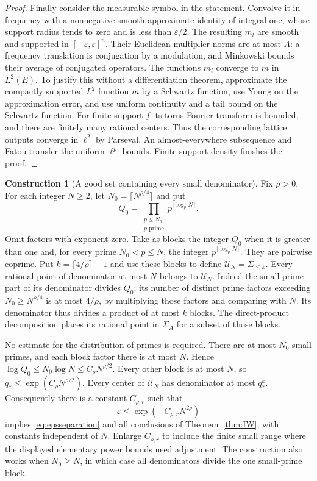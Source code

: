 \documentclass[11pt,oneside]{article}
\theoremstyle{definition}\newtheorem{definition}[theorem]{Definition}
\newtheorem{construction}[theorem]{Construction}
\theoremstyle{remark}\newtheorem{remark}[theorem]{Remark}
\begin{document}
\begin{proof}
Finally consider the measurable symbol in the statement. Convolve it in
frequency with a nonnegative smooth approximate identity of integral one,
whose support radius tends to zero and is less than $\varepsilon/2$.
The resulting $m_l$ are smooth and supported in
$[-\varepsilon,\varepsilon]^n$. Their Euclidean multiplier norms are at
most $A$: a frequency translation is conjugation by a modulation, and
Minkowski bounds their average of conjugated operators. The functions $m_l$
converge to $m$ in $L^2(E)$. To justify this without a differentiation
 theorem, approximate the compactly supported $L^2$ function $m$ by a
Schwartz function, use Young on the approximation error, and use uniform
continuity and a tail bound on the Schwartz function.
For finite-support $f$ its torus Fourier transform is bounded, and there
are finitely many rational centers. Thus the corresponding lattice outputs
converge in $\ell^2$ by Parseval. An almost-everywhere subsequence and Fatou
transfer the uniform $\ell^p$ bounds. Finite-support density finishes the
proof.
\end{proof}

\begin{construction}[A good set containing every small denominator]\label{con:goodset}
Fix $\rho>0$. For each integer $N\geq2$, let $N_0=\lceil N^{\rho/4}\rceil$
and put
\[
 Q_0=\prod_{\substack{p\leq N_0\\p\text{ prime}}}
                p^{\lfloor\log_p N\rfloor}.
\]
Omit factors with exponent zero. Take as blocks the integer $Q_0$ when it
is greater than one and, for every prime $N_0<p\leq N$, the integer
$p^{\lfloor\log_p N\rfloor}$. They are pairwise coprime. Put
$k=\lceil4/\rho\rceil+1$ and use these blocks to define
$\mathcal U_N=\Sigma_{\leq k}$.
Every rational point of denominator at most $N$ belongs to $\mathcal U_N$.
Indeed the small-prime part of its denominator divides $Q_0$; its number of
distinct prime factors exceeding $N_0\geq N^{\rho/4}$ is at most $4/\rho$,
by multiplying those factors and comparing with $N$. Its denominator thus
divides a product of at most $k$ blocks. The direct-product decomposition
places its rational point in $\Sigma_A$ for a subset of those blocks.

No estimate for the distribution of primes is required. There are at most
$N_0$ small primes, and each block factor there is at most $N$. Hence
$\log Q_0\leq N_0\log N\leq C_\rho N^{\rho/2}$. Every other block is at most
$N$, so $q_*\leq\exp(C_\rho N^{\rho/2})$. Every center of $\mathcal U_N$ has
denominator at most $q_*^k$. Consequently there is a constant $C_{\rho,r}$
such that
\[
 \varepsilon\leq\exp(-C_{\rho,r}N^{2\rho})
\]
implies \eqref{eq:epsseparation} and all conclusions of
Theorem~\ref{thm:IW}, with constants independent of $N$.
Enlarge $C_{\rho,r}$ to include the finite small range where the displayed
elementary power bounds need adjustment. The construction also works when
$N_0\geq N$, in which case all denominators divide the one small-prime block.
\end{construction}
\end{document}

